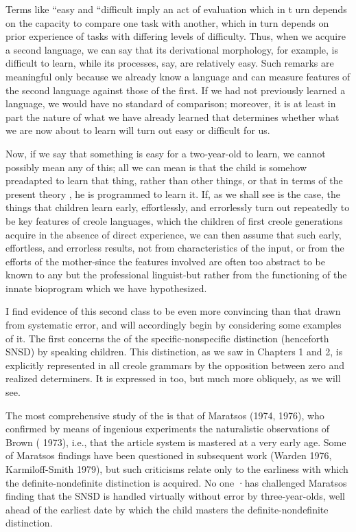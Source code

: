 Terms like ``easy and ``difficult imply an act of evaluation
which in t urn depends on the capacity to compare one task with another, which in turn depends on prior experience of tasks with differing levels of difficulty. Thus, when we acquire a second language, we can say that its derivational morphology, for example, is difficult to learn, while its  processes, say, are relatively easy. Such remarks are meaningful only because we already know a language and can measure features of the second language against those of the first. If we had not previously learned a language, we would have no standard of comparison; moreover, it is at least in part the nature of what we have already learned that determines whether what we are now about to learn will turn out easy or difficult for us.

Now, if we say that something is easy for a two-year-old to
learn, we cannot possibly mean any of this; all we can mean is that the child is somehow preadapted to learn that thing, rather than other things, or that in terms of the present theory , he is programmed to learn it. If, as we shall see is the case, the things that children learn early, effortlessly, and errorlessly turn out repeatedly to be key features of creole languages, which the children of first creole generations acquire in the absence of direct experience, we can then assume that such early, effortless, and errorless  results, not from charac\-teristics of the input, or from the efforts of the mother-since the features involved are often too abstract to be known to any but the professional linguist-but rather from the functioning of the innate bioprogram which we have hypothesized.

I find evidence of this second class to be even more convincing
than that drawn from systematic error, and will accordingly begin by considering some examples of it. The first concerns the  of the specific-nonspecific distinction (henceforth SNSD) by \-speaking children. This distinction, as we saw in Chapters 1 and 2, is explicitly represented in all creole grammars by the opposition
between zero and realized determiners. It is expressed in  too, but much more obliquely, as we will see.

The most comprehensive study of the    is that of Maratsos (1974, 1976), who confirmed by means of ingenious experiments the naturalistic observations of Brown ( 1973), i.e., that the article system is mastered at a very early age. Some of Maratsos findings have been questioned in subsequent work (Warden 1976, Karmiloff-Smith 1979), but such criticisms relate only to the earliness with which the definite-nondefinite distinction is acquired. No one ·has challenged Maratsos finding that the SNSD is handled virtually without error by three-year-olds, well ahead of the earliest date by which the child masters the definite-nondefinite distinction.


